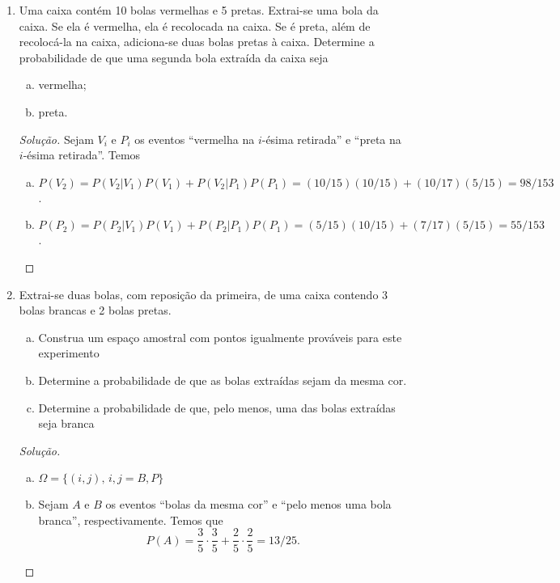 \documentclass[../Notas.tex]{subfiles}
\begin{document}
\begin{enumerate}
\begin{proof}[Solução]
\begin{enumerate}[a)]
        \end{enumerate}
    \end{proof}
    \item Uma caixa contém 10 bolas vermelhas e 5 pretas. Extrai-se uma bola da caixa. Se ela é vermelha, ela é recolocada na caixa. Se é preta, além de recolocá-la na caixa, adiciona-se duas bolas pretas à caixa. Determine a probabilidade de que uma segunda bola extraída da caixa seja
    \begin{enumerate}[a)]
    \item vermelha;
    \item preta.
    \end{enumerate}
    \begin{proof}[Solução]
        Sejam $V_i$ e $P_i$ os eventos ``vermelha na $i$-ésima retirada'' e ``preta na $i$-ésima retirada''.
        Temos
        \begin{enumerate}[a)]
            \item $P(V_2) = P(V_2|V_1)P(V_1) + P(V_2|P_1)P(P_1) = (10/15)(10/15) + (10/17)(5/15) = 98/153$.
            \item $P(P_2) = P(P_2|V_1)P(V_1) + P(P_2|P_1)P(P_1) = (5/15)(10/15) + (7/17)(5/15) = 55/153$.
        \end{enumerate}
    \end{proof}
    \item Extrai-se duas bolas, com reposição da primeira, de uma caixa contendo 3 bolas brancas e 2 bolas pretas.
    \begin{enumerate}[a)]
    \item Construa um espaço amostral com pontos igualmente prováveis para este experimento
    \item Determine a probabilidade de que as bolas extraídas sejam da mesma cor.
    \item Determine a probabilidade de que, pelo menos, uma das bolas extraídas seja branca
    \end{enumerate}
    \begin{proof}[Solução]
        \begin{enumerate}[a)]
            \item $\Omega = \{ (i,j), \, i,j = B,P \}$
            \item Sejam $A$ e $B$ os eventos ``bolas da mesma cor'' e ``pelo menos uma bola branca'',
            respectivamente. Temos que
            \[
            P(A) = \frac{3}{5}\cdot\frac{3}{5} + \frac{2}{5}\cdot\frac{2}{5} = 13/25.
\]
\end{enumerate}
\end{proof}
\end{enumerate}
\end{document}
